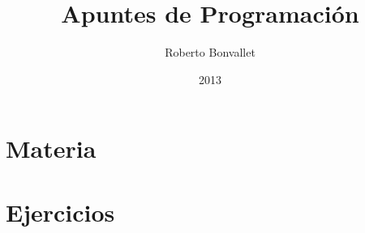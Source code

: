 \documentclass[dvipsnames]{memoir}
\title{Apuntes de Programaci\'on}
\author{
  Roberto Bonvallet %
}
\date{2013}
\begin{document}
  \frontmatter
  
  \newpage
  

  \mainmatter
  \part{Materia}
  
  \part{Ejercicios}
  
  
  
%  
\end{document}

